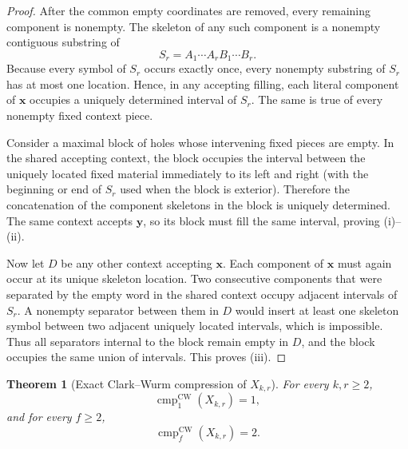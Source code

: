 \documentclass[11pt]{article}
\newtheorem{theorem}{Theorem}[section]
\theoremstyle{definition}
\theoremstyle{remark}
\newcommand{\cmp}{\operatorname{cmp}}
\begin{document}
\begin{proof}
After the common empty coordinates are removed, every remaining component is
nonempty.  The skeleton of any such component is a nonempty contiguous
substring of
\[
 S_r=A_1\cdots A_rB_1\cdots B_r.
\]
Because every symbol of $S_r$ occurs exactly once, every nonempty substring of
$S_r$ has at most one location.  Hence, in any accepting filling, each literal
component of $\mathbf x$ occupies a uniquely determined interval of $S_r$.
The same is true of every nonempty fixed context piece.

Consider a maximal block of holes whose intervening fixed pieces are empty.
In the shared accepting context, the block occupies the interval between the
uniquely located fixed material immediately to its left and right (with the
beginning or end of $S_r$ used when the block is exterior).  Therefore the
concatenation of the component skeletons in the block is uniquely determined.
The same context accepts $\mathbf y$, so its block must fill the same interval,
proving (i)--(ii).

Now let $D$ be any other context accepting $\mathbf x$.  Each component of
$\mathbf x$ must again occur at its unique skeleton location.  Two consecutive
components that were separated by the empty word in the shared context occupy
adjacent intervals of $S_r$.  A nonempty separator between them in $D$ would
insert at least one skeleton symbol between two adjacent uniquely located
intervals, which is impossible.  Thus all separators internal to the block
remain empty in $D$, and the block occupies the same union of intervals.  This
proves (iii).
\end{proof}

\begin{theorem}[Exact Clark--Wurm compression of $X_{k,r}$]
\label{thm:X-cw-compression}
For every $k,r\ge2$,
\[
 \boxed{\cmp_1^{\mathrm{CW}}(X_{k,r})=1,}
\]
and for every $f\ge2$,
\[
 \boxed{\cmp_f^{\mathrm{CW}}(X_{k,r})=2.}
\]
\end{theorem}
\end{document}
